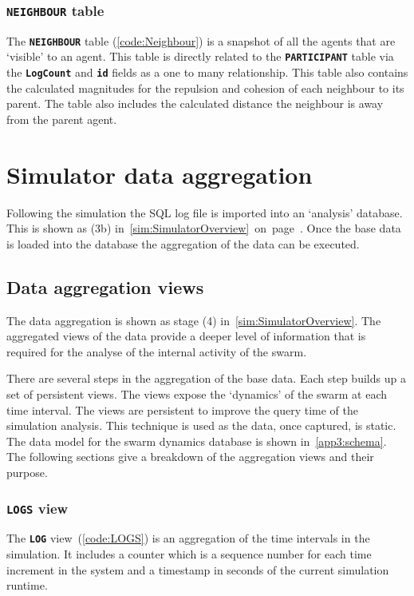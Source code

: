 \subsubsection{\texttt{\textbf{NEIGHBOUR}} table} 
The \texttt{\textbf{NEIGHBOUR}} table (\autoref{code:Neighbour}) is a snapshot of all the agents that are `visible' to an agent. This table is directly related to the \texttt{\textbf{PARTICIPANT}} table via the \texttt{\textbf{LogCount}} and \texttt{\textbf{id}} fields as a one to many relationship. This table also contains the calculated magnitudes for the repulsion and cohesion of each neighbour to its parent. The table also includes the calculated distance the neighbour is away from the parent agent. 

\section{Simulator data aggregation}
Following the simulation the SQL log file is imported into an `analysis' database. This is shown as (3b) in~\autoref{sim:SimulatorOverview}~on~page~\pageref{sim:SimulatorOverview}. Once the base data is loaded into the database the aggregation of the data can be executed.

\subsection{Data aggregation views}
The data aggregation is shown as stage (4) in~\autoref{sim:SimulatorOverview}. The aggregated views of the data provide a deeper level of information that is required for the analyse of the internal activity of the swarm.

There are several steps in the aggregation of the base data. Each step builds up a set of persistent views. The views expose the `dynamics' of the swarm at each time interval. The views are persistent to improve the query time of the simulation analysis. This technique is used as the data, once captured, is static. The data model for the swarm dynamics database is shown in~\autoref{app3:schema}. The following sections give a breakdown of the aggregation views and their purpose.

\subsubsection{\texttt{\textbf{LOGS}} view}
The \texttt{\textbf{LOG}} view~(\autoref{code:LOGS}) is an aggregation of the time intervals in the simulation. It includes a counter which is a sequence number for each time increment in the system and a timestamp in seconds of the current simulation runtime.

